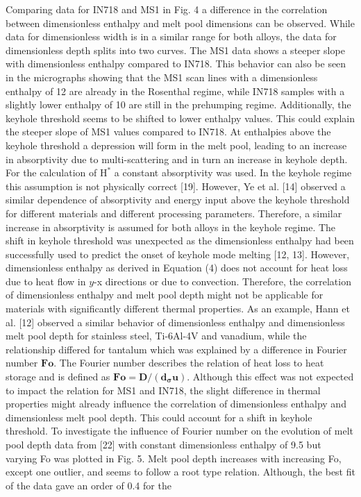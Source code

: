 \documentclass[10pt]{article}
\begin{document}
Comparing data for IN718 and MS1 in Fig. 4 a difference in the correlation between dimensionless enthalpy and melt pool dimensions can be observed. While data for dimensionless width is in a similar range for both alloys, the data for dimensionless depth splits into two curves. The MS1 data shows a steeper slope with dimensionless enthalpy compared to IN718. This behavior can also be seen in the micrographs showing that the MS1 scan lines with a dimensionless enthalpy of 12 are already in the Rosenthal regime, while IN718 samples with a slightly lower enthalpy of 10 are still in the prehumping regime. Additionally, the keyhole threshold seems to be shifted to lower enthalpy values. This could explain the steeper slope of MS1 values compared to IN718. At enthalpies above the keyhole threshold a depression will form in the melt pool, leading to an increase in absorptivity due to multi-scattering and in turn an increase in keyhole depth. For the calculation of $\mathrm{H}^{*}$ a constant absorptivity was used. In the keyhole regime this assumption is not physically correct [19]. However, Ye et al. [14] observed a similar dependence of absorptivity and energy input above the keyhole threshold for different materials and different processing parameters. Therefore, a similar increase in absorptivity is assumed for both alloys in the keyhole regime. The shift in keyhole threshold was unexpected as the dimensionless enthalpy had been successfully used to predict the onset of keyhole mode melting [12, 13]. However, dimensionless enthalpy as derived in Equation (4) does not account for heat loss due to heat flow in $y$-x directions or due to convection. Therefore, the correlation of dimensionless enthalpy and melt pool depth might not be applicable for materials with significantly different thermal properties. As an example, Hann et al. [12] observed a similar behavior of dimensionless enthalpy and dimensionless melt pool depth for stainless steel, Ti-6Al-4V and vanadium, while the relationship differed for tantalum which was explained by a difference in Fourier number $\boldsymbol{F} \boldsymbol{o}$. The Fourier number describes the relation of heat loss to heat storage and is defined as $\boldsymbol{F o}=\boldsymbol{D} /\left(\boldsymbol{d}_{\boldsymbol{\sigma}} \boldsymbol{u}\right)$. Although this effect was not expected to impact the relation for MS1 and IN718, the slight difference in thermal properties might already influence the correlation of dimensionless enthalpy and dimensionless melt pool depth. This could account for a shift in keyhole threshold. To investigate the influence of Fourier number on the evolution of melt pool depth data from [22] with constant dimensionless enthalpy of 9.5 but varying Fo was plotted in Fig. 5. Melt pool depth increases with increasing Fo, except one outlier, and seems to follow a root type relation. Although, the best fit of the data gave an order of 0.4 for the
\end{document}
